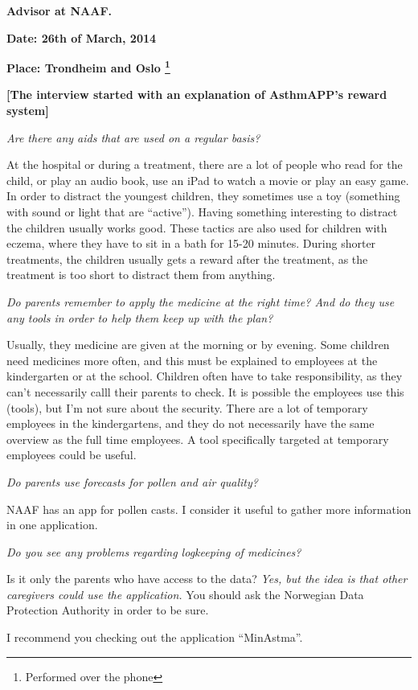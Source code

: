 \textbf{Advisor at NAAF.}

\textbf{Date: 26th of March, 2014}

\textbf{Place: Trondheim and Oslo \footnote{Performed over the phone}}

\textbf{[The interview started with an explanation of AsthmAPP's reward system]}

\emph{Are there any aids that are used on a regular basis?}

At the hospital or during a treatment, there are a lot of people who read for the child, or play an audio book, use an iPad to watch a movie or play an easy game. In order to distract the youngest children, they sometimes use a toy (something with sound or light that are ``active''). Having something interesting to distract the children usually works good. These tactics are also used for children with eczema, where they have to sit in a bath for 15-20 minutes.
During shorter treatments, the children usually gets a reward after the treatment, as the treatment is too short to distract them from anything.

\emph{Do parents remember to apply the medicine at the right time? And do they use any tools in order to help them keep up with the plan?}

Usually, they medicine are given at the morning or by evening. Some children need medicines more often, and this must be explained to employees at the kindergarten or at the school. Children often have to take responsibility, as they can't necessarily calll their parents to check. It is possible the employees use this (tools), but I'm not sure about the security. There are a lot of temporary employees in the kindergartens, and they do not necessarily have the same overview as the full time employees. A tool specifically targeted at temporary employees could be useful. 

\emph{Do parents use forecasts for pollen and air quality?}

NAAF has an app for pollen casts. I consider it useful to gather more information in one application. 

\emph{Do you see any problems regarding logkeeping of medicines?}

Is it only the parents who have access to the data?
\emph{Yes, but the idea is that other caregivers could use the application.}
You should ask the Norwegian Data Protection Authority in order to be sure. 

I recommend you checking out the application ``MinAstma''.

